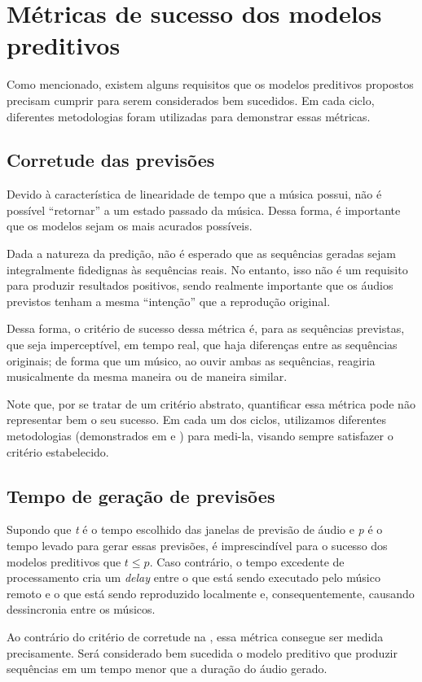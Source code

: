 \section{Métricas de sucesso dos modelos preditivos}

Como mencionado, existem alguns requisitos que os modelos preditivos propostos precisam cumprir para serem considerados bem sucedidos. Em cada ciclo, diferentes metodologias foram utilizadas para demonstrar essas métricas.

\subsection{Corretude das previsões}
\label{subsec:prediction_correctness}

Devido à característica de linearidade de tempo que a música possui, não é possível ``retornar'' a um estado passado da música. Dessa forma, é importante que os modelos sejam os mais acurados possíveis.

Dada a natureza da predição, não é esperado que as sequências geradas sejam integralmente fidedignas às sequências reais. No entanto, isso não é um requisito para produzir resultados positivos, sendo realmente importante que os áudios previstos tenham a mesma ``intenção'' que a reprodução original.

Dessa forma, o critério de sucesso dessa métrica é, para as sequências previstas, que seja imperceptível, em tempo real, que haja diferenças entre as sequências originais; de forma que um músico, ao ouvir ambas as sequências, reagiria musicalmente da mesma maneira ou de maneira similar.

Note que, por se tratar de um critério abstrato, quantificar essa métrica pode não representar bem o seu sucesso. Em cada um dos ciclos, utilizamos diferentes metodologias (demonstrados em  e ) para medi-la, visando sempre satisfazer o critério estabelecido.

\subsection{Tempo de geração de previsões}

Supondo que \textit{t} é o tempo escolhido das janelas de previsão de áudio e \textit{p} é o tempo levado para gerar essas previsões, é imprescindível para o sucesso dos modelos preditivos que $t \leq p $. Caso contrário, o tempo excedente de processamento cria um \textit{delay} entre o que está sendo executado pelo músico remoto e o que está sendo reproduzido localmente e, consequentemente, causando dessincronia entre os músicos.

Ao contrário do critério de corretude na , essa métrica consegue ser medida precisamente. Será considerado bem sucedida o modelo preditivo que produzir sequências em um tempo menor que a duração do áudio gerado.

